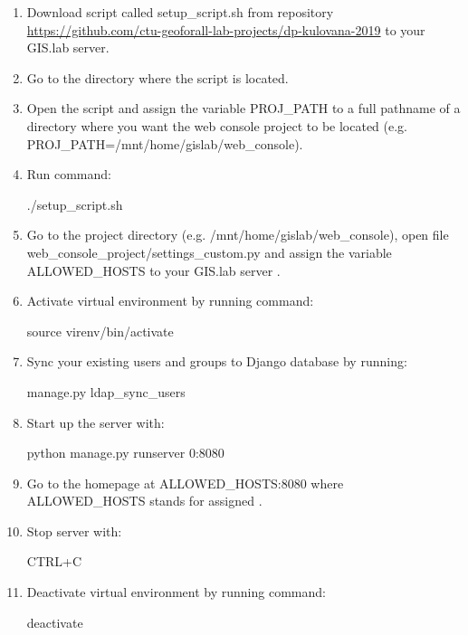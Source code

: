 \begin{enumerate}
\item{Download script called \textsf{setup\_script.sh} from repository \href{https://github.com/ctu-geoforall-lab-projects/dp-kulovana-2019}{https://github.com/ctu-geoforall-lab-projects/dp-kulovana-2019} to your GIS.lab server.}

\item{Go to the directory where the script is located.}

\item{Open the script and assign the variable \textsf{PROJ\_PATH} to a full pathname of a directory where you want the web console project to be located \linebreak (e.g. \textsf{PROJ\_PATH=/mnt/home/gislab/web\_console}).}

\item{Run command:}
\begin{center}
\textsf{./setup\_script.sh}
\end{center}

\item{Go to the project directory (e.g. \textsf{/mnt/home/gislab/web\_console}), open file \textsf{web\_console\_project/settings\_custom.py} and assign the variable \linebreak\textsf{ALLOWED\_HOSTS} to your GIS.lab server .}

\item{Activate virtual environment by running command:}
\begin{center}
\textsf{source virenv/bin/activate}
\end{center}

\item{Sync your existing  users and groups to Django database by running:}
\begin{center}
\textsf{manage.py ldap\_sync\_users}
\end{center}

\newpage
\item{Start up the server with:}
\begin{center}
\textsf{python manage.py runserver 0:8080}
\end{center}

\item{Go to the homepage at \textsf{ALLOWED\_HOSTS:8080} where \textsf{ALLOWED\_HOSTS} stands for assigned .}

\item{Stop server with:}
\begin{center}
\textsf{CTRL+C}
\end{center}

\item{Deactivate virtual environment by running command:}
\begin{center}
\textsf{deactivate}
\end{center}
\end{enumerate}

